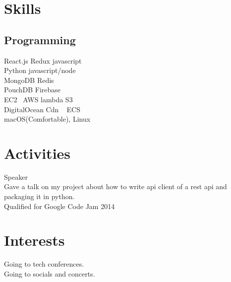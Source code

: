 \documentclass[]{deedy-resume-openfont}
\begin{document}
\begin{minipage}[t]{0.33\textwidth}




\section{Skills}
\subsection{Programming}
\textbullet{} React.js \textbullet{} Redux \textbullet{} javascript \\
\textbullet{} Python \textbullet{} javascript/node \\
\textbullet{} MongoDB \textbullet{} Redis \\
\textbullet{} PouchDB \textbullet{} Firebase \\
\textbullet{} EC2 \ AWS lambda \textbullet{} S3 \\
\textbullet{} DigitalOcean \textbullet{} Cdn \ \textbullet{} ECS \\
\textbullet{} macOS(Comfortable), Linux \\
\sectionsep

%
%

\section{Activities}
\textbullet{} Speaker \\
\textbullet{} Gave a talk on my project about how to write api client of a rest api and packaging it in python. \\
\textbullet{}  Qualified for Google Code Jam 2014  \\
\sectionsep
%
%

\section{Interests}
\textbullet{} Going to tech conferences. \\
\textbullet{} Going to socials and concerts. \\

%
%

\end{minipage}
\end{document}
